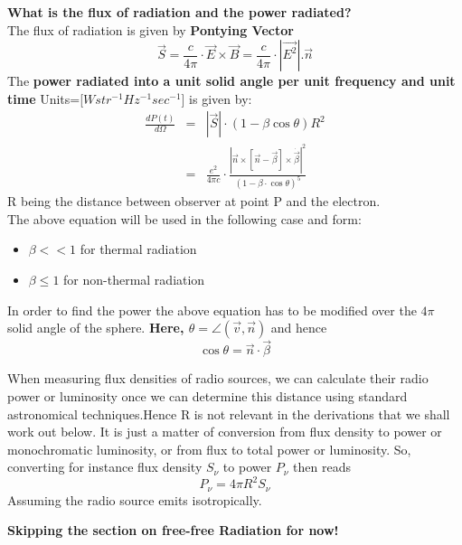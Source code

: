 \documentclass[11pt]{report}
\newcommand{\cbox}{tcolorbox}
\newcommand{\rr}[1]{\left[{#1}\right]}
\newcommand{\vd}[1]{\dot{\vec{#1}}}
\begin{document}
\textbf{What is the flux of radiation and the power radiated?}\\
The flux of radiation is given by \textbf{Pontying Vector}
\begin{equation}
\vec{S}=\frac{c}{4\pi}\cdot \vec{E}\times\vec{B}=\frac{c}{4\pi}\cdot |\vec{E^2}|.\vec{n}
\end{equation}
The \textbf{power radiated into a unit solid angle per unit frequency and unit time} Units=[$Wstr^{-1}Hz^{-1}sec^{-1}$] is given by:
\begin{align}
\frac{dP(t)}{d\Omega}&=&|\vec{S}|\cdot(1-\beta \cos \theta)R^2\\
&=&\frac{e^2}{4 \pi c}\cdot \frac{|\vec{n}\times\rr{\vec{n}-\vec{\beta}}\times\vd{\beta}|^2}{(1-\beta \cdot \cos \theta)^5}
\end{align}
R being the distance between observer at point P and the electron.\\
The above equation will be used in the following case and form:
\begin{itemize}
\item $\beta<<1$ for  thermal radiation
\item $\beta\leq 1$ for non-thermal radiation
\end{itemize}
In order to find the power the above equation has to be modified over the $4\pi$ solid angle of the sphere. \textbf{Here, $\theta=\angle (\vec{v},\vec{n})$} and hence
\begin{equation*}
\cos \theta = \vec{n} \cdot \vec{\beta}
\end{equation*}
\begin{\cbox}
When measuring flux densities of radio sources, we can calculate their radio power or luminosity once we can determine this distance using standard astronomical techniques.Hence R is not relevant in the derivations that we shall work out below. It is just a matter of conversion from flux density to power or monochromatic luminosity, or from flux to total power or luminosity. So, converting for instance flux density $S_\nu$ to power $P_\nu$ then reads
\begin{equation*}
P_\nu=4 \pi R^2 S_\nu
\end{equation*}
Assuming the radio source emits isotropically.
\end{\cbox}
\textbf{Skipping the section on free-free Radiation for now!}
\end{document}
